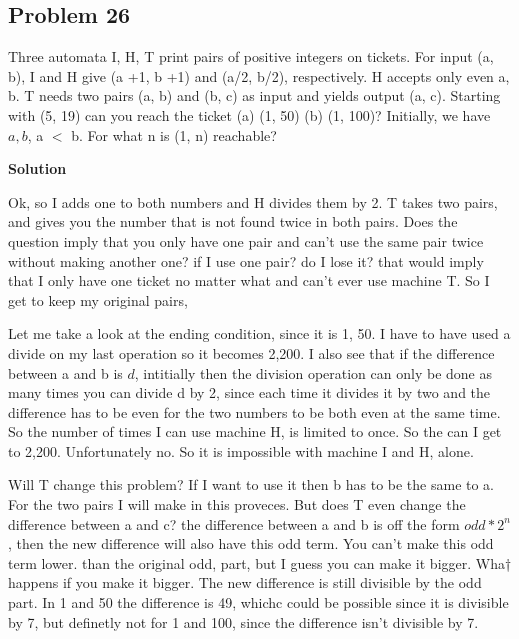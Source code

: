 \documentclass[12pt,tikz,border=10pt]{article}
\theoremstyle{definition}
\theoremstyle{remark}
\begin{document}
\subsection{Problem 26}
Three automata I, H, T print pairs of positive integers on tickets. For input (a, b), I
and H give (a +1, b +1) and (a/2, b/2), respectively. H accepts only even a, b. T
needs two pairs (a, b) and (b, c) as input and yields output (a, c). Starting with (5, 19)
can you reach the ticket (a) (1, 50) (b) (1, 100)? Initially, we have \(a, b\), a $<$ b. For
what n is (1, n) reachable?

\textbf{Solution}

Ok, so I adds one to both numbers and H divides them by 2. T takes two pairs,
and gives you the number that is not found twice in both pairs. Does the question
imply that you only have one pair and can't use the same pair twice without making another one? if
I use one pair? do I lose it? that would imply that I only have one ticket no matter what
and can't ever use machine T. So I get to keep my original pairs, 

Let me take a look at the ending condition, since it is 1, 50. I have to have used a divide on 
my last operation so it becomes 2,200. I also see that if the difference between a and b is $d$, intitially
then the division operation can only be done as many times you can divide d by 2, since each time it divides it by two 
and the difference has to be even for the two numbers to be both even at the same time. So the number of times I can use machine H, 
is limited to once. So the can I get to 2,200. Unfortunately no. So it is impossible with machine I and H, alone.

Will T change this problem? If I want to use it then b has to be the same to a. For the two pairs I will make in this proveces.
But does T even change the difference between a and c? the difference between a and b is off the form $odd * 2^n$, then the new difference will also have this odd term.
You can't make this odd term lower. than the original odd, part, but I guess you can make it bigger.
Wha† happens if you make it bigger. The new difference is still divisible by the odd part.
In 1 and 50 the difference is 49, whichc could be possible since it is divisible by 7, but definetly not for 1 and 100, since 
the difference isn't divisible by 7.
\end{document}
